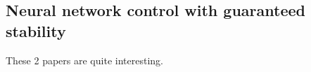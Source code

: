 

\subsection{Neural network control with guaranteed stability \cite{modified_SGD_for_neural_network_control}\cite{stability_condition_for_uncertain_systems}}
These 2 papers are quite interesting. 
